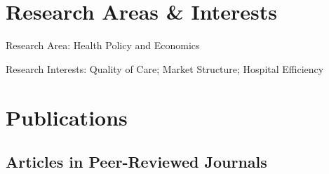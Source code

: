 \documentclass[12pt,letterpaper]{report}
\newcommand{\listitemspace}{0.15em}
\renewenvironment{itemize}
{\begin{list}{}{\setlength{\leftmargin}{0em}
            \setlength{\parskip}{0em}
            \setlength{\itemsep}{\listitemspace}
            \setlength{\parsep}{\listitemspace}}}
    {\end{list}}
\begin{document}
    \section*{Research Areas \& Interests }

    \begin{itemize}

        \item Research Area: Health Policy and Economics
        \item Research Interests: Quality of Care; Market Structure; Hospital Efficiency

    \end{itemize}



    \section*{Publications}

    \subsection*{Articles in Peer-Reviewed Journals}
\end{document}
